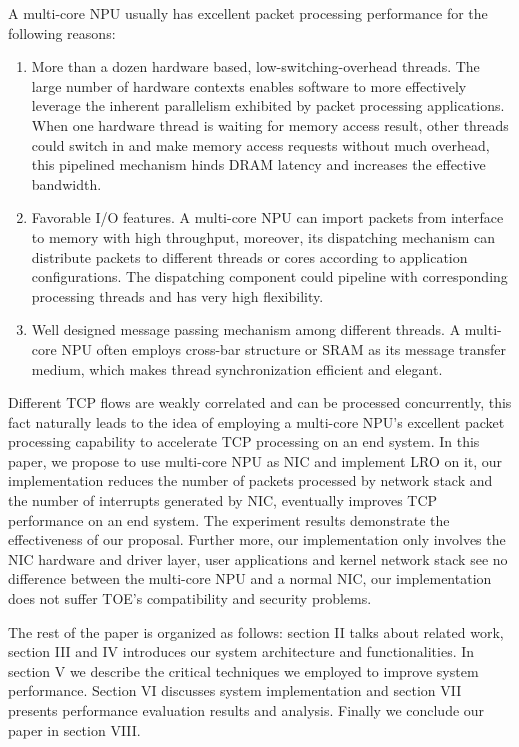 \documentclass[conference]{IEEEtran}
\begin{document}
A multi-core NPU usually has excellent packet processing performance for the following reasons:
\begin{enumerate}
\item More than a dozen hardware based, low-switching-overhead threads. The large number of hardware contexts enables software to more effectively leverage the inherent parallelism exhibited by packet processing applications. When one hardware thread is waiting for memory access result, other threads could switch in and make memory access requests without much overhead, this pipelined mechanism hinds DRAM latency and increases the effective bandwidth.
\item Favorable I/O features. A multi-core NPU can import packets from interface to memory with high throughput, moreover, its dispatching mechanism can distribute packets to different threads or cores according to application configurations. The dispatching component could pipeline with corresponding processing threads and has very high flexibility.
\item Well designed message passing mechanism among different threads. A multi-core NPU often employs cross-bar structure or SRAM as its message transfer medium, which makes thread synchronization efficient and elegant.
\end{enumerate}

Different TCP flows are weakly correlated and can be processed concurrently, this fact naturally leads to the idea of employing a multi-core NPU's excellent packet processing capability to accelerate TCP processing on an end system. In this paper, we propose to use multi-core NPU as NIC and implement LRO on it, our implementation reduces the number of packets processed by network stack and the number of interrupts generated by NIC, eventually improves TCP performance on an end system. The experiment results demonstrate the effectiveness of our proposal. Further more, our implementation only involves the NIC hardware and driver layer, user applications and kernel network stack see no difference between the multi-core NPU and a normal NIC, our implementation does not suffer TOE's compatibility and security problems.

The rest of the paper is organized as follows: section II talks about related work, section III and IV introduces our system architecture and functionalities. In section V we describe the critical techniques we employed to improve system performance. Section VI discusses system implementation and section VII presents performance evaluation results and analysis. Finally we conclude our paper in section VIII.
\end{document}
